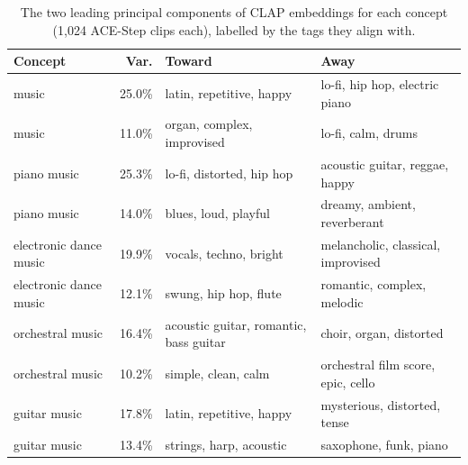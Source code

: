 \begin{table}[t]\centering\small
\begin{tabular}{lrll}
\toprule
Concept & Var. & Toward & Away \\
\midrule
music & 25.0\% & latin, repetitive, happy & lo-fi, hip hop, electric piano \\
music & 11.0\% & organ, complex, improvised & lo-fi, calm, drums \\
piano music & 25.3\% & lo-fi, distorted, hip hop & acoustic guitar, reggae, happy \\
piano music & 14.0\% & blues, loud, playful & dreamy, ambient, reverberant \\
electronic dance music & 19.9\% & vocals, techno, bright & melancholic, classical, improvised \\
electronic dance music & 12.1\% & swung, hip hop, flute & romantic, complex, melodic \\
orchestral music & 16.4\% & acoustic guitar, romantic, bass guitar & choir, organ, distorted \\
orchestral music & 10.2\% & simple, clean, calm & orchestral film score, epic, cello \\
guitar music & 17.8\% & latin, repetitive, happy & mysterious, distorted, tense \\
guitar music & 13.4\% & strings, harp, acoustic & saxophone, funk, piano \\
\bottomrule
\end{tabular}
\caption{The two leading principal components of CLAP embeddings for each concept (1{,}024 ACE-Step clips each), labelled by the tags they align with.}\label{tab:pca}
\end{table}
